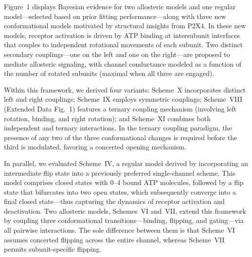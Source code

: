 \documentclass[pdflatex,sn-mathphys-num]{sn-jnl}%
\theoremstyle{thmstyleone}%
\theoremstyle{thmstyletwo}%
\theoremstyle{thmstylethree}%
\begin{document}
Figure~1 displays Bayesian evidence for two allosteric models and one regular model—selected based on prior fitting performance—along with three new conformational models motivated by structural insights from P2X4. In these new models, receptor activation is driven by ATP binding at intersubunit interfaces that couples to independent rotational movements of each subunit. Two distinct secondary couplings—one on the left and one on the right—are proposed to mediate allosteric signaling, with channel conductance modeled as a function of the number of rotated subunits (maximal when all three are engaged).

Within this framework, we derived four variants: Scheme~X incorporates distinct left and right couplings; Scheme~IX employs symmetric couplings; Scheme~VIII (Extended Data Fig.~1) features a ternary coupling mechanism (involving left rotation, binding, and right rotation); and Scheme~XI combines both independent and ternary interactions. In the ternary coupling paradigm, the presence of any two of the three conformational changes is required before the third is modulated, favoring a concerted opening mechanism.

In parallel, we evaluated Scheme~IV, a regular model derived by incorporating an intermediate flip state into a previously preferred single-channel scheme. This model comprises closed states with 0--4 bound ATP molecules, followed by a flip state that bifurcates into two open states, which subsequently converge into a final closed state—thus capturing the dynamics of receptor activation and deactivation. Two allosteric models, Schemes~VI and~VII, extend this framework by coupling three conformational transitions—binding, flipping, and gating—via all pairwise interactions. The sole difference between them is that Scheme~VI assumes concerted flipping across the entire channel, whereas Scheme~VII permits subunit-specific flipping.
\end{document}

